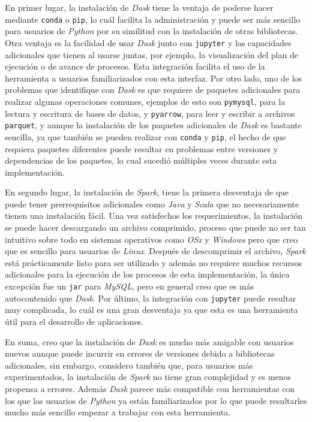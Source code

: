 En primer lugar, la instalación de \textit{Dask} tiene la ventaja de poderse hacer mediante \texttt{conda} o \texttt{pip}, lo cuál facilita la administración y puede ser más sencillo para usuarios de \textit{Python} por su similitud con la instalación de otras bibliotecas. Otra ventaja es la facilidad de usar \textit{Dask} junto con \texttt{jupyter} y las capacidades adicionales que tienen al usarse juntas, por ejemplo, la visualización del plan de ejecución o de avance de procesos. Esta integración facilita el uso de la herramienta a usuarios familiarizados con esta interfaz. Por otro lado, uno de los problemas que identifique con \textit{Dask} es que requiere de paquetes adicionales para realizar algunas operaciones comunes, ejemplos de esto son \texttt{pymysql}, para la lectura y escritura de bases de datos, y \texttt{pyarrow}, para leer y escribir a archivos \texttt{parquet}, y aunque la instalación de los paquetes adicionales de \textit{Dask} es bastante sencilla, ya que también se pueden realizar con \texttt{conda} y \texttt{pip}, el hecho de que requiera paquetes diferentes puede resultar en problemas entre versiones y dependencias de los paquetes, lo cual sucedió múltiples veces durante esta implementación.

En segundo lugar, la instalación de \textit{Spark}, tiene la primera desventaja de que puede tener prerrequisitos adicionales como \textit{Java} y \textit{Scala} que no necesariamente tienen una instalación fácil. Una vez satisfechos los requerimientos, la instalación se puede hacer descargando un archivo comprimido, proceso que puede no ser tan intuitivo sobre todo en sistemas operativos como \textit{OSx} y \textit{Windows} pero que creo que es sencillo para usuarios de \textit{Linux}. Después de descomprimir el archivo, \textit{Spark} está prácticamente listo para ser utilizado y además no requiere muchos recursos adicionales para la ejecución de los procesos de esta implementación, la única excepción fue un \texttt{jar} para \textit{MySQL}, pero en general creo que es más autocontenido que \textit{Dask}. Por último, la integración con \texttt{jupyter} puede resultar muy complicada, lo cuál es una gran desventaja ya que esta es una herramienta útil para el desarrollo de aplicaciones.

En suma, creo que la instalación de \textit{Dask} es mucho más amigable con usuarios nuevos aunque puede incurrir en errores de versiones debido a bibliotecas adicionales, sin embargo, considero también que, para usuarios más experimentados, la instalación de \textit{Spark} no tiene gran complejidad y es menos propensa a errores. Además \textit{Dask} parece más compatible con herramientas con los que los usuarios de \textit{Python} ya están familiarizados por lo que puede resultarles mucho más sencillo empezar a trabajar con esta herramienta. 

